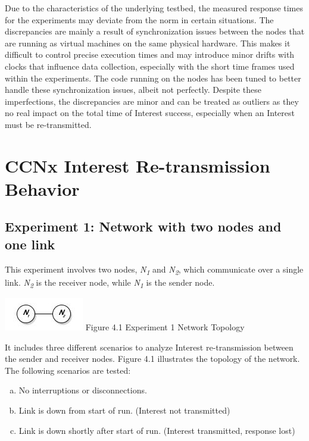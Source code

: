 \documentclass[a4paper,12pt]{report}      %
\begin{document}
Due to the characteristics of the underlying testbed, the measured response times for the experiments 
may deviate from the norm in certain situations. The discrepancies are mainly a result of synchronization
issues between the nodes that are running as virtual machines on the same physical hardware. This makes it 
difficult to control precise execution times and may introduce minor drifts with clocks that influence data
collection, especially with the short time frames used within the experiments. The code running on the nodes has
been tuned to better handle these synchronization issues, albeit not perfectly. Despite these imperfections, the 
discrepancies are minor and can be treated as outliers as they no real impact on the total time of Interest success,
especially when an Interest must be re-transmitted.
 
\section{CCNx Interest Re-transmission Behavior}

\subsection{Experiment 1: Network with two nodes and one link}

This experiment involves two nodes, \emph{N\textsubscript{1}} and \emph{N\textsubscript{2}}, which communicate over a single link. \emph{N\textsubscript{2}} is the receiver node, while \emph{N\textsubscript{1}} is the sender node.

\begin{center}
\includegraphics[scale=0.75]{exp1topo.jpg}\newline
Figure 4.1 Experiment 1 Network Topology\end{center}

\noindent It includes three different scenarios to analyze Interest re-transmission between the sender and receiver
nodes. Figure 4.1 illustrates the topology of the network. The following scenarios are tested:

\begin{enumerate}[(a)]
\item No interruptions or disconnections.
\item Link is down from start of run. (Interest not transmitted)
\item Link is down shortly after start of run. (Interest transmitted, response lost)
\end{enumerate}
\end{document}
